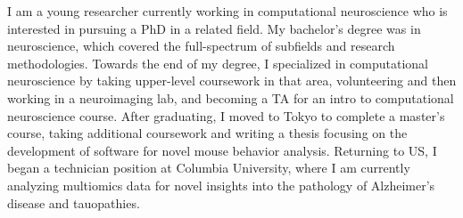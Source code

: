 %
%
%

\vspace*{-0.1cm}

\begin{cvparagraph}
    {I am a young researcher currently working in computational neuroscience who is
        interested in pursuing a PhD in a related field. My bachelor's degree was in
        neuroscience, which covered the full-spectrum of subfields and research
        methodologies. Towards the end of my degree, I specialized in computational
        neuroscience by taking upper-level coursework in that area, volunteering and
        then working in a neuroimaging lab, and becoming a TA for an intro to
        computational neuroscience course. After graduating, I moved to Tokyo to
        complete a master's course, taking additional coursework and writing a thesis
        focusing on the development of software for novel mouse behavior analysis.
        Returning to US, I began a technician position at Columbia University, where I
        am currently analyzing multiomics data for novel insights into the pathology of
        Alzheimer's disease and tauopathies.}

\vspace*{-0.5cm}
\end{cvparagraph}
